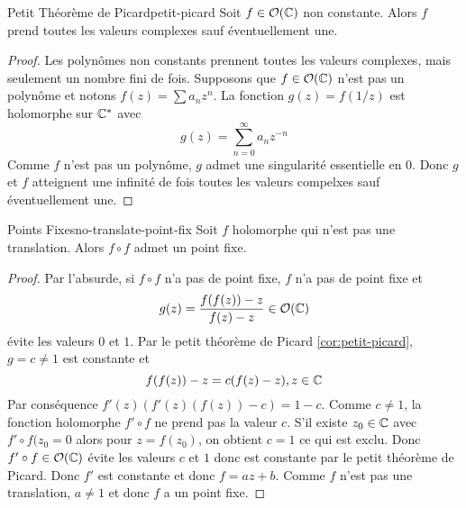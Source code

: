\documentclass{cours}
\begin{document}
\begin{corollaire}
	{Petit Théorème de Picard}{petit-picard}
	Soit $f \in \mathcal{O}(\mathbb{C})$ non constante. Alors $f$ prend toutes les valeurs complexes sauf éventuellement une. 
\end{corollaire}
\begin{proof}
	Les polynômes non constants prennent toutes les valeurs complexes, mais seulement un nombre fini de fois. 
	Supposons que $f \in \mathcal{O}(\mathbb{C})$ n'est pas un polynôme et notons $f(z) = \sum a_{n}z^{n}$. 
	La fonction $g(z) = f(1/z)$ est holomorphe sur $\mathbb{C}^{*}$ avec 
	\begin{equation*}
		g(z) = \sum_{n = 0}^{\infty} a_{n}z^{-n}
	\end{equation*}
	Comme $f$ n'est pas un polynôme, $g$ admet une singularité essentielle en $0$. 
	Donc $g$ et $f$ atteignent une infinité de fois toutes les valeurs compelxes sauf éventuellement une. 
\end{proof}

\begin{corollaire}
	{Points Fixes}{no-translate-point-fix}
	Soit $f$ holomorphe qui n'est pas une translation. Alors $f \circ f$ admet un point fixe.
\end{corollaire}
\begin{proof}
	Par l'absurde, si $f \circ f$ n'a pas de point fixe, $f$ n'a pas de point fixe et 
	\begin{equation*}
		g(z) = \frac{f(f(z)) - z}{f(z) - z} \in \mathcal{O}(\mathbb{C})
	\end{equation*}
	évite les valeurs $0$ et $1$. 
	Par le petit théorème de Picard \ref{cor:petit-picard}, $g = c \neq 1$ est constante et 
	\begin{equation*}
		f(f(z)) - z = c(f(z) - z), z \in \mathbb{C}
	\end{equation*}
	Par conséquence $f'(z)(f'(z)(f(z)) - c) = 1 - c$. 
	Comme $c \neq 1$, la fonction holomorphe $f'\circ f$ ne prend pas la valeur $c$. S'il existe $z_{0} \in \mathbb{C}$
	avec $f'\circ f(z_{0} = 0$ alors pour $z = f(z_{0})$, on obtient $c = 1$ ce qui est exclu. 
		Donc $f' \circ f \in \mathcal{O}(\mathbb{C})$ évite les valeurs $c$ et $1$ donc est constante par le petit théorème de Picard. 
	Donc $f'$ est constante et donc $f = az + b$. Comme $f$ n'est pas une translation, $a \neq 1$ et donc $f$ a un point fixe. 
\end{proof}
\end{document}
